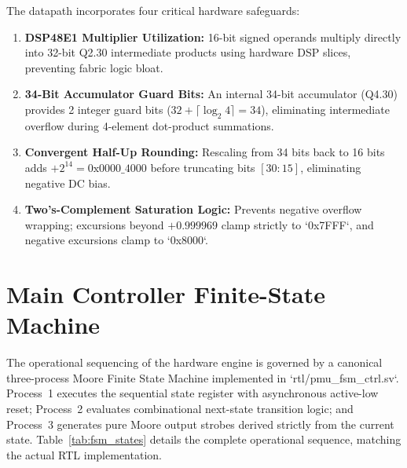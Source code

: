 \documentclass[12pt,a4paper]{report}
\begin{document}
The datapath incorporates four critical hardware safeguards:
\begin{enumerate}
    \item \textbf{DSP48E1 Multiplier Utilization:} 16-bit signed operands multiply directly
    into 32-bit Q2.30 intermediate products using hardware DSP slices, preventing fabric logic bloat.
    \item \textbf{34-Bit Accumulator Guard Bits:} An internal 34-bit accumulator (Q4.30) provides
    2 integer guard bits ($32 + \lceil \log_2 4 \rceil = 34$), eliminating intermediate overflow
    during 4-element dot-product summations.
    \item \textbf{Convergent Half-Up Rounding:} Rescaling from 34 bits back to 16 bits adds
    $+2^{14} = \text{0x0000\_4000}$ before truncating bits $[30:15]$, eliminating negative DC bias.
    \item \textbf{Two's-Complement Saturation Logic:} Prevents negative overflow wrapping;
    excursions beyond $+0.999969$ clamp strictly to `0x7FFF`, and negative excursions clamp to `0x8000`.
\end{enumerate}

\section{Main Controller Finite-State Machine}
The operational sequencing of the hardware engine is governed by a canonical three-process
Moore Finite State Machine implemented in `rtl/pmu_fsm_ctrl.sv`. Process~1 executes the
sequential state register with asynchronous active-low reset; Process~2 evaluates combinational
next-state transition logic; and Process~3 generates pure Moore output strobes derived
strictly from the current state. Table~\ref{tab:fsm_states} details the complete operational
sequence, matching the actual RTL implementation.
\end{document}
